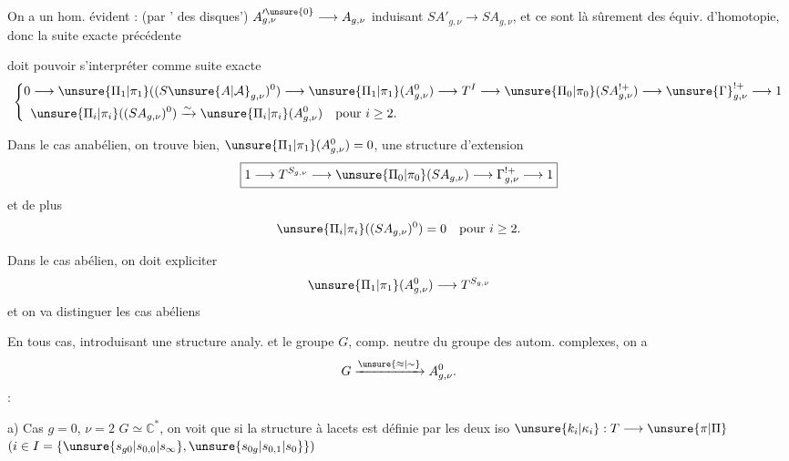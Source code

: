 On a un hom. évident : (par ' des disques')
$A_{g,\nu}^{\prime\unsure{0}}\longrightarrow A_{g,\nu}$ induisant
$SA'_{g,\nu}\longrightarrow SA_{g,\nu}$,
 et ce sont là sûrement des équiv. d'homotopie, donc
 la suite exacte précédente



doit pouvoir s'interpréter comme suite exacte
\[
\left\{\begin{aligned}
0&\longrightarrow\unsure{\Pi_1|\pi_1}((S\unsure{A|\mathcal A}_{g,\nu})^0)
\longrightarrow\unsure{\Pi_1|\pi_1}(A_{g,\nu}^0)
\longrightarrow T^I\longrightarrow\unsure{\Pi_0|\pi_0}(SA_{g,\nu}^{!+})
\longrightarrow\unsure{\Gamma}_{g,\nu}^{!+}\longrightarrow1\\
&\unsure{\Pi_i|\pi_i}((SA_{g,\nu})^0)\xrightarrow{\sim}
\unsure{\Pi_i|\pi_i}(A_{g,\nu}^0)\quad\text{pour }i\geq2.
\end{aligned}\right.
\]

Dans le cas anabélien, on trouve bien, 
$\unsure{\Pi_1|\pi_1}(A_{g,\nu}^0)=0$, une structure d'extension
\[
\boxed{1\longrightarrow T^{S_{g,\nu}}\longrightarrow
\unsure{\Pi_0|\pi_0}(SA_{g,\nu})\longrightarrow\Gamma_{g,\nu}^{!+}\longrightarrow1}
\]
et de plus
\[
\unsure{\Pi_i|\pi_i}((SA_{g,\nu})^0)=0\quad\text{pour }i\geq2.
\]

Dans le cas abélien, on doit expliciter
\[
\unsure{\Pi_1|\pi_1}(A_{g,\nu}^0)\longrightarrow T^{S_{g,\nu}}
\]
et on va distinguer les  cas abéliens

En tous cas, introduisant une structure analy.  et le groupe $G$, comp. neutre du groupe des autom. complexes, on a
\[
G\xrightarrow{\unsure{\approx|\sim}}A_{g,\nu}^0.
\]
 :

a) Cas $g=0$, $\nu=2$ 
$G\simeq\mathbb C^*$, 
on voit que si la structure à lacets  est définie par les deux iso
$\unsure{k_i|\kappa_i}:T\longrightarrow\unsure{\pi|\Pi}$
$(i\in I=\{\unsure{s_{g0}|s_{0,0}|s_\infty},\unsure{s_{0g}|s_{0,1}|s_0}\})$


